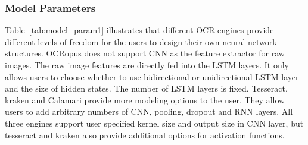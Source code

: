 \documentclass[conference]{IEEEtran}
\begin{document}
\subsubsection{Model Parameters}

Table~\ref{tab:model_param1} illustrates that different OCR engines provide
different levels of freedom for the users to design their own neural network
structures. OCRopus does not support CNN as the feature extractor for raw
images. The raw image features are directly fed into the LSTM layers. It only
allows users to choose whether to use bidirectional or unidirectional LSTM
layer and the size of hidden states. The number of LSTM layers is fixed.
Tesseract, kraken and Calamari provide more modeling options to the user. They
allow users to add arbitrary numbers of CNN, pooling, dropout and RNN
layers. All three engines support user specified kernel size and output size in
CNN layer, but tesseract and kraken also provide additional options for
activation functions.

\end{document}
